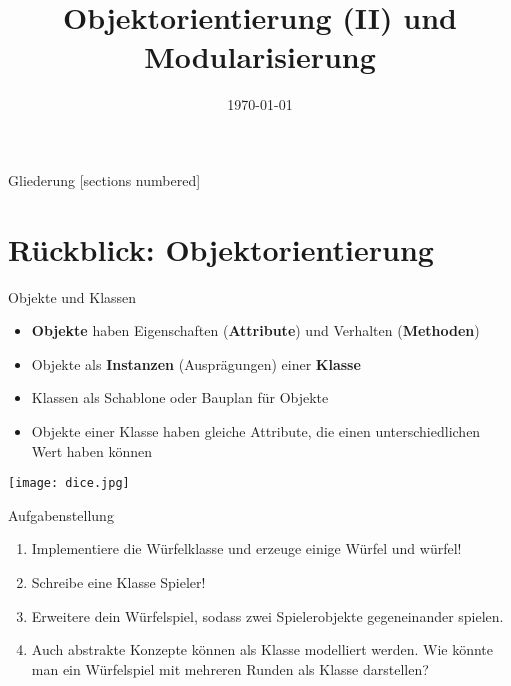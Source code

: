 



\title{Objektorientierung (II) und Modularisierung}
\date{\today}




\maketitle

\begin{frame}{Gliederung}
    [sections numbered]
    \tableofcontents
\end{frame}

\section{Rückblick: Objektorientierung}

\begin{frame}{Objekte und Klassen}
    \begin{itemize}
	\item \textbf{Objekte} haben Eigenschaften (\textbf{Attribute}) und Verhalten (\textbf{Methoden})
	\item Objekte als \textbf{Instanzen} (Ausprägungen) einer \textbf{Klasse} 
	\item Klassen als \glqq Schablone\grqq{} oder \glqq Bauplan\grqq{} für Objekte
	\item Objekte einer Klasse haben gleiche Attribute, die einen unterschiedlichen Wert haben können
    \end{itemize}
    \texttt{[image: dice.jpg]}
\end{frame}


\begin{frame}{Aufgabenstellung}
    \begin{enumerate}
        \item Implementiere die Würfelklasse und erzeuge einige Würfel und würfel!
        \item Schreibe eine Klasse \glqq Spieler\grqq!
        \item Erweitere dein Würfelspiel, sodass zwei Spielerobjekte gegeneinander spielen.
        \item Auch abstrakte Konzepte können als Klasse modelliert werden. Wie könnte man ein Würfelspiel mit mehreren Runden als Klasse darstellen?
    \end{enumerate}
\end{frame}


